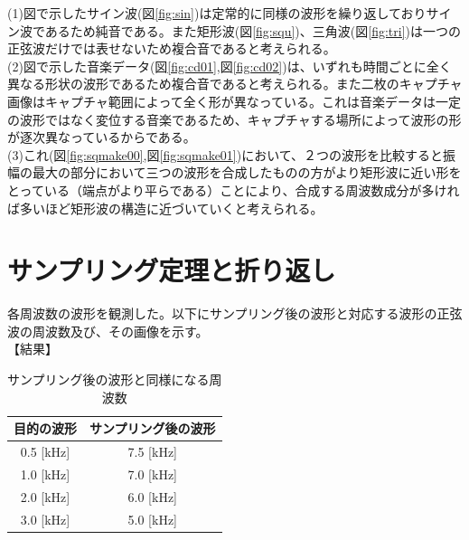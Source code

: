 \documentclass[uplatex, titlepage]{jsarticle}
\begin{document}
(1)図で示したサイン波(図\ref{fig:sin})は定常的に同様の波形を繰り返しておりサイン波であるため純音である。また矩形波(図\ref{fig:squ})、三角波(図\ref{fig:tri})は一つの正弦波だけでは表せないため複合音であると考えられる。 \\
(2)図で示した音楽データ(図\ref{fig:cd01},図\ref{fig:cd02})は、いずれも時間ごとに全く異なる形状の波形であるため複合音であると考えられる。また二枚のキャプチャ画像はキャプチャ範囲によって全く形が異なっている。これは音楽データは一定の波形ではなく変位する音楽であるため、キャプチャする場所によって波形の形が逐次異なっているからである。\\
(3)これ(図\ref{fig:sqmake00},図\ref{fig:sqmake01})において、２つの波形を比較すると振幅の最大の部分において三つの波形を合成したものの方がより矩形波に近い形をとっている（端点がより平らである）ことにより、合成する周波数成分が多ければ多いほど矩形波の構造に近づいていくと考えられる。\\

\section{サンプリング定理と折り返し}

  各周波数の波形を観測した。以下にサンプリング後の波形と対応する波形の正弦波の周波数及び、その画像を示す。　\\

【結果】
\begin{table}[H]
  \centering
  \caption{サンプリング後の波形と同様になる周波数}
  \label{table:curve}
  \begin{tabular}{|c|c|} \hline
    目的の波形 & サンプリング後の波形 \\ \hline
    0.5 [kHz] & 7.5 [kHz] \\ \hline
    1.0 [kHz] & 7.0 [kHz] \\ \hline
    2.0 [kHz] & 6.0 [kHz] \\ \hline
    3.0 [kHz] & 5.0 [kHz] \\ \hline
  \end{tabular}
\end{table}
\end{document}
